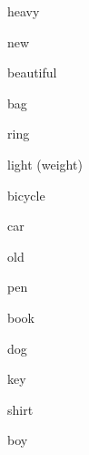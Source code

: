 

\begin{flashcard}{\LARGE heavy}
\LARGE {}
\end{flashcard}
\begin{flashcard}{\LARGE new}
\LARGE {}
\end{flashcard}
\begin{flashcard}{\LARGE beautiful}
\LARGE {}
\end{flashcard}
\begin{flashcard}{\LARGE bag}
\LARGE {}
\end{flashcard}
\begin{flashcard}{\LARGE ring}
\LARGE {}
\end{flashcard}
\begin{flashcard}{\LARGE light (weight)}
\LARGE {}
\end{flashcard}
\begin{flashcard}{\LARGE bicycle}
\LARGE {}
\end{flashcard}
\begin{flashcard}{\LARGE car}
\LARGE {}
\end{flashcard}
\begin{flashcard}{\LARGE old}
\LARGE {}
\end{flashcard}
\begin{flashcard}{\LARGE pen}
\LARGE {}
\end{flashcard}
\begin{flashcard}{\LARGE book}
\LARGE {}
\end{flashcard}
\begin{flashcard}{\LARGE dog}
\LARGE {}
\end{flashcard}
\begin{flashcard}{\LARGE key}
\LARGE {}
\end{flashcard}
\begin{flashcard}{\LARGE shirt}
\LARGE {}
\end{flashcard}
\begin{flashcard}{\LARGE boy}
\LARGE {}
\end{flashcard}
